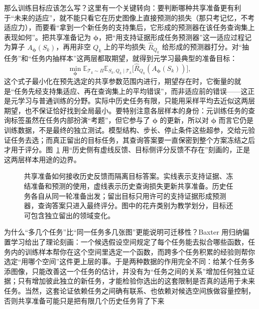 那么训练目标应该怎么写？这里有一个关键转向：要判断哪种共享准备更有利于“未来的适应”，就不能只看它在历史图像上直接预测的损失（那只考记忆，不考适应力），而要看“拿到一个新任务的支持集后，它形成的预测器在该任务查询集上表现如何”。把共享准备记为 $\bm\phi$，把“用支持证据形成任务预测器”这一适应过程记为算子 $A_{\bm\phi}(S_k)$，再用非空 $Q_k$ 上的平均损失 $\hat R_{Q_k}$ 给形成的预测器打分。对“抽任务”和“任务内抽样本”这两层都取期望，就得到元学习最典型的准备目标：
\begin{equation}
  \min_{\bm{\phi}}
  \mathbb E_{\mathcal T_k\sim\Pi}
  \mathbb E_{S_k,Q_k\mid\mathcal T_k}
  \bigl[\hat R_{Q_k}(A_{\bm{\phi}}(S_k))\bigr],
  \label{eq:ket-transfer-meta-objective}
\end{equation}
这个式子最小化在预先选定的共享参数范围内进行，期望存在时，它衡量的就是“任务先经支持集适应、再在查询集上的平均错误”，而非适应前的错误——这正是元学习与普通训练的分野。实际中历史任务有限，只能用采样平均去近似这两层期望，也不保证恰好找到全局最小。要特别注意各层样本的身份：元训练任务的查询标签虽然在任务内部扮演“考题”，但它参与了 $\bm\phi$ 的更新，所以对 $\bm\phi$ 而言它仍是训练数据，不是最终的独立测试。模型结构、步长、停止条件这些超参，交给元验证任务去选；而真正留出的目标任务，其查询答案要一直保密到整个方案冻结之后才用于评分。图~\ref{fig:ket-transfer-data-boundaries} 用“历史侧有虚线反馈、目标侧评分反馈不存在”刻画的，正是这两层样本用途的边界。

\begin{figure}[htbp]
  \centering
  
  \caption{共享准备如何接收历史反馈而隔离目标答案。实线表示支持证据、冻结准备和预测的使用，虚线表示历史查询损失更新共享准备。历史任务各自从同一轮准备出发；留出目标只用许可的支持证据形成预测器，查询答案只进入最终评分。图中的花卉类别为教学划分，目标还可包含独立留出的领域变化。}
  \label{fig:ket-transfer-data-boundaries}
\end{figure}

为什么“多几个任务”比“同一任务多几张图”更能说明可迁移性？Baxter 用归纳偏置学习给出了理论刻画：一个候选假设空间规定了每个任务能去拟合哪些函数，任务内的训练样本帮你在这个空间里选定一个函数，而跨多个任务积累的经验则帮你选定“用哪个空间”这件更上层的事。于是两种数据的作用完全不同：给某个任务多添图像，只能改善这一个任务的估计，并没有为“任务之间的关系”增加任何独立证据；只有增加彼此独立的新任务，才能检验你选出的这套限制是否真的适用于未来任务。当然，这套论证依赖任务之间确有联系、也依赖对候选空间族做容量控制，否则共享准备可能只是把有限几个历史任务背了下来

